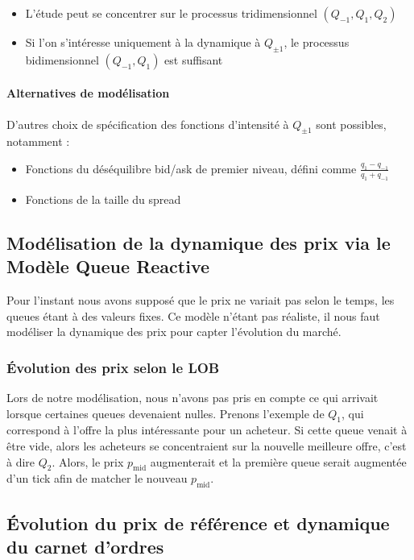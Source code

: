 \documentclass[12pt,a4paper]{article}
\theoremstyle{definition}
\theoremstyle{remark}
\begin{document}
    \begin{itemize}
        \item L'étude peut se concentrer sur le processus tridimensionnel $(Q_{-1}, Q_1, Q_2)$
        \item Si l'on s'intéresse uniquement à la dynamique à $Q_{\pm1}$, le processus bidimensionnel $(Q_{-1}, Q_1)$ est suffisant
    \end{itemize}

    \paragraph{Alternatives de modélisation}
    D'autres choix de spécification des fonctions d'intensité à $Q_{\pm1}$ sont possibles, notamment :
    \begin{itemize}
        \item Fonctions du déséquilibre bid/ask de premier niveau, défini comme $\frac{q_1-q_{-1}}{q_1+q_{-1}}$
        \item Fonctions de la taille du spread
    \end{itemize}

    \subsection{Modélisation de la dynamique des prix via le Modèle Queue Reactive}

    Pour l'instant nous avons supposé que le prix ne variait pas selon le temps, les queues étant à des valeurs fixes. Ce modèle n'étant pas réaliste, il nous faut modéliser la dynamique des prix pour capter l'évolution du marché. 
    \subsubsection{Évolution des prix selon le LOB}
    Lors de notre modélisation, nous n'avons pas pris en compte ce qui arrivait lorsque certaines queues devenaient nulles. Prenons l'exemple de $Q_1$, qui correspond à l'offre la plus intéressante pour un acheteur. Si cette queue venait à être vide, alors les acheteurs se concentraient sur la nouvelle meilleure offre, c'est à dire $Q_2$. Alors, le prix $p_{\text{mid}}$ augmenterait et la première queue serait augmentée d'un tick afin de matcher le nouveau $p_{\text{mid}}$.

    \subsection{Évolution du prix de référence et dynamique du carnet d'ordres}
\end{document}
